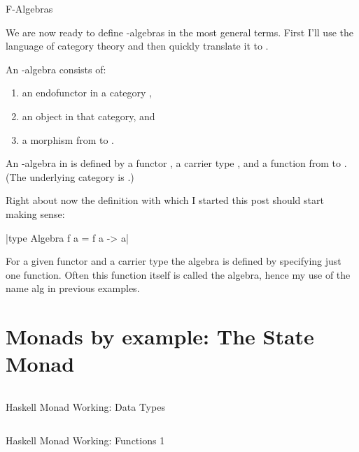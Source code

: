\documentclass[proposal.tex]{subfiles}
\begin{document}
F-Algebras


We are now ready to define -algebras in the most general terms.
First I'll use the language of category theory and then quickly translate it to .

An -algebra consists of:
\begin{enumerate}
\item an endofunctor  in a category ,
\item an object  in that category, and
\item a morphism from  to .
\end{enumerate}

An -algebra in  is defined by a functor , a carrier type , and a function from  to . (The underlying category is .)

Right about now the definition with which I started this post should start making sense:

|type Algebra f a = f a -> a|

For a given functor  and a carrier type  the algebra is defined by specifying just one function.
Often this function itself is called the algebra, hence my use of the name alg in previous examples.


\section{Monads by example: The State Monad}


\begin{code-list}[th]
  \begin{singlespace}
    \inputminted[linenos, firstline=16, lastline=33]{haskell}{haskell-monad-working-2.hs}
  \end{singlespace}
  \caption{Haskell Monad Working: Data Types}
\label{tab:hskllmndworkngdatatype}
\end{code-list}

\begin{code-list}[th]
  \begin{singlespace}
    \inputminted[linenos, firstline=35, lastline=65]{haskell}{haskell-monad-working-2.hs}
  \end{singlespace}
  \caption{Haskell Monad Working: Functions 1}
\label{tab:hskllmndworkngfunctions}
\end{code-list}
\end{document}
